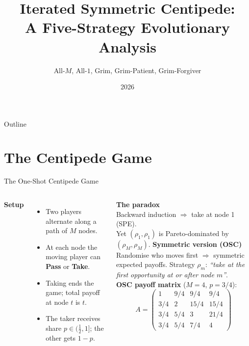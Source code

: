 \documentclass[aspectratio=169]{beamer}
\title[Iterated Symmetric Centipede]{Iterated Symmetric Centipede:\\A Five-Strategy Evolutionary Analysis}
\subtitle{All-$M$, All-$1$, Grim, Grim-Patient, Grim-Forgiver}
\date{2026}
\begin{document}

\begin{frame}
  \titlepage
\end{frame}

\begin{frame}{Outline}
  \tableofcontents
\end{frame}

\section{The Centipede Game}

\begin{frame}{The One-Shot Centipede Game}
  \begin{columns}
      \textbf{Setup}
      \begin{itemize}
        \item Two players alternate along a path of $M$ nodes.
        \item At each node the moving player can \textbf{Pass} or \textbf{Take}.
        \item Taking ends the game; total payoff at node $t$ is $t$.
        \item The taker receives share $p \in (\tfrac{1}{2},1]$; the other gets $1-p$.
      \end{itemize}
      \vspace{6pt}
      \textbf{The paradox}\\
      Backward induction $\Rightarrow$ take at node 1 (SPE).\\
      Yet $(\rho_1,\rho_1)$ is Pareto-dominated by $(\rho_M,\rho_M)$.
      \textbf{Symmetric version (OSC)}\\[4pt]
      Randomise who moves first $\Rightarrow$ symmetric expected payoffs.
      Strategy $\rho_m$: \emph{``take at the first opportunity at or after node $m$''}.\\[6pt]
      \textbf{OSC payoff matrix} ($M{=}4$, $p{=}3/4$):
      \[
      A =
      \begin{pmatrix}
        1    & 9/4  & 9/4  & 9/4 \\
        3/4  & 2    & 15/4 & 15/4\\
        3/4  & 5/4  & 3    & 21/4\\
        3/4  & 5/4  & 7/4  & 4
      \end{pmatrix}
      \]
  \end{columns}
\end{frame}
\end{document}
